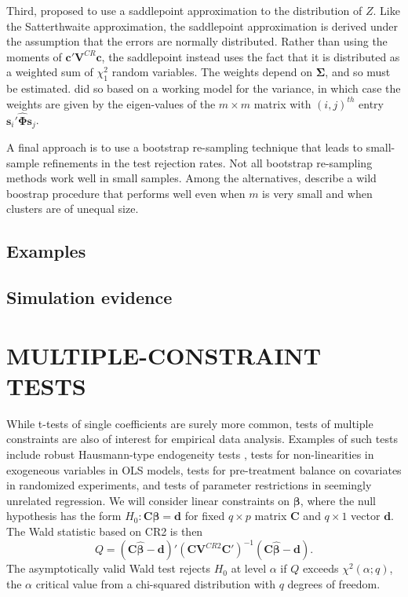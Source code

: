 \documentclass[12pt]{article}\usepackage[]{graphicx}\usepackage[]{color}
\newcommand{\bm}{\mathbf}
\newcommand{\bs}{\boldsymbol}
\begin{document}
Third, \citet{McCaffrey2006improved} proposed to use a saddlepoint approximation to the distribution of $Z$. 
Like the Satterthwaite approximation, the saddlepoint approximation is derived under the assumption that the errors are normally distributed. 
Rather than using the moments of $\bm{c}'\bm{V}^{CR}\bm{c}$, the saddlepoint instead uses the fact that it is distributed as a weighted sum of $\chi^2_1$ random variables. 
The weights depend on $\bs\Sigma$, and so must be estimated. \citet{McCaffrey2006improved} did so based on a working model for the variance, in which case the weights are given by the eigen-values of the $m \times m$ matrix with $(i,j)^{th}$ entry $\bm{s}_i'\hat{\bs\Phi} \bm{s}_j$. 

A final approach is to use a bootstrap re-sampling technique that leads to small-sample refinements in the test rejection rates. 
Not all bootstrap re-sampling methods work well in small samples. 
Among the alternatives, \citet{Webb2013wild} describe a wild boostrap procedure that performs well even when $m$ is very small and when clusters are of unequal size.

\subsection{Examples}
\label{subsec:examples_t}

\subsection{Simulation evidence}
\label{subsec:simulation_t}

\section{MULTIPLE-CONSTRAINT TESTS}

While t-tests of single coefficients are surely more common, tests of multiple constraints are also of interest for empirical data analysis. 
Examples of such tests include robust Hausmann-type endogeneity tests \citep{Arellano1993on}, tests for non-linearities in exogeneous variables in OLS models, tests for pre-treatment balance on covariates in randomized experiments, and tests of parameter restrictions in seemingly unrelated regression.
We will consider linear constraints on $\bs\beta$, where the null hypothesis has the form $H_0: \bm{C}\bs\beta = \bm{d}$ for fixed $q \times p$ matrix $\bm{C}$ and $q \times 1$ vector $\bm{d}$. 
The Wald statistic based on CR2 is then \[
Q = \left(\bm{C}\bs{\hat\beta} - \bm{d}\right)'\left(\bm{C} \bm{V}^{CR2} \bm{C}'\right)^{-1}\left(\bm{C}\bs{\hat\beta} - \bm{d}\right).
\]
The asymptotically valid Wald test rejects $H_0$ at level $\alpha$ if $Q$ exceeds $\chi^2(\alpha; q)$, the $\alpha$ critical value from a chi-squared distribution with $q$ degrees of freedom.
\end{document}
